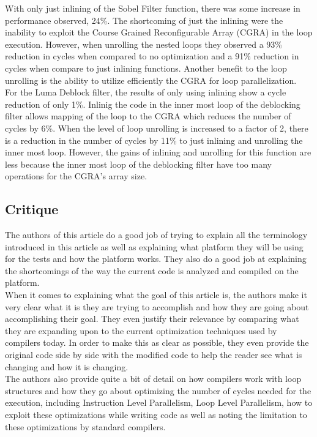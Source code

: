 \documentclass[letterpaper,10pt,titlepage]{article}
\begin{document}
With only just inlining of the Sobel Filter function, there was some increase 
in performance observed, 24\%. The shortcoming of just the inlining were the 
inability to exploit the Course Grained Reconfigurable Array (CGRA) in the 
loop execution. However, when unrolling the nested loops they observed a 93\% 
reduction in cycles when compared to no optimization and a 91\% reduction in 
cycles when compare to just inlining functions. Another benefit to the loop 
unrolling is the ability to utilize efficiently the CGRA for loop 
parallelization.\\

For the Luma Deblock filter, the results of only using inlining show a cycle 
reduction of only 1\%. Inlinig the code in the inner most loop of the 
deblocking filter allows mapping of the loop to the CGRA which reduces the
number of cycles by 6\%. When the level of loop unrolling is increased to a 
factor of 2, there is a reduction in the number of cycles by 11\% to just 
inlining and unrolling the inner most loop. However, the gains of inlining 
and unrolling for this function are less because the inner most loop of the 
deblocking filter have too many operations for the CGRA's array size.\\


\subsection*{Critique}
The authors of this article do a good job of trying to explain all the 
terminology introduced in this article as well as explaining what platform 
they will be using for the tests and how the platform works. They also do a 
good job at explaining the shortcomings of the way the current code is 
analyzed and compiled on the platform.\\

When it comes to explaining what the goal of this article is, the authors make
 it very clear what it is they are trying to accomplish and how they are going
 about accomplishing their goal. They even justify their relevance by 
comparing what they are expanding upon to the current optimization techniques 
used by compilers today. In order to make this as clear as possible, they 
even provide the original code side by side with the modified code to help 
the reader see what is changing and how it is changing.\\

The authors also provide quite a bit of detail on how compilers work with 
loop structures and how they go about optimizing the number of cycles needed 
for the execution, including Instruction Level Parallelism, Loop Level 
Parallelism, how to exploit these optimizations while writing code as well as 
noting the limitation to these optimizations by standard compilers.\\
\end{document}
